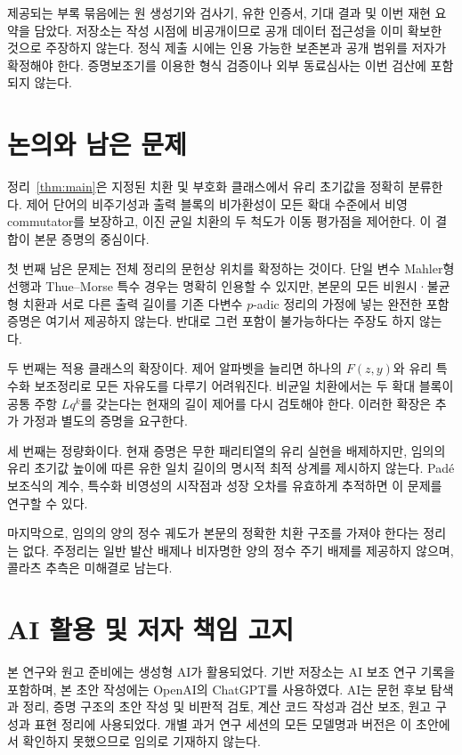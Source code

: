 \documentclass[11pt,a4paper]{article}
\theoremstyle{koreanplain}
\begin{document}
제공되는 부록 묶음에는 원 생성기와 검사기, 유한 인증서, 기대 결과 및 이번 재현 요약을 담았다. 저장소는 작성 시점에 비공개이므로 공개 데이터 접근성을 이미 확보한 것으로 주장하지 않는다. 정식 제출 시에는 인용 가능한 보존본과 공개 범위를 저자가 확정해야 한다. 증명보조기를 이용한 형식 검증이나 외부 동료심사는 이번 검산에 포함되지 않는다.

\section{논의와 남은 문제}

정리~\ref{thm:main}은 지정된 치환 및 부호화 클래스에서 유리 초기값을 정확히 분류한다. 제어 단어의 비주기성과 출력 블록의 비가환성이 모든 확대 수준에서 비영 commutator를 보장하고, 이진 균일 치환의 두 척도가 이동 평가점을 제어한다. 이 결합이 본문 증명의 중심이다.

첫 번째 남은 문제는 전체 정리의 문헌상 위치를 확정하는 것이다. 단일 변수 Mahler형 선행과 Thue--Morse 특수 경우는 명확히 인용할 수 있지만, 본문의 모든 비원시·불균형 치환과 서로 다른 출력 길이를 기존 다변수 $p$-adic 정리의 가정에 넣는 완전한 포함 증명은 여기서 제공하지 않는다. 반대로 그런 포함이 불가능하다는 주장도 하지 않는다.

두 번째는 적용 클래스의 확장이다. 제어 알파벳을 늘리면 하나의 $F(z,y)$와 유리 특수화 보조정리로 모든 자유도를 다루기 어려워진다. 비균일 치환에서는 두 확대 블록이 공통 주항 $Lq^k$를 갖는다는 현재의 길이 제어를 다시 검토해야 한다. 이러한 확장은 추가 가정과 별도의 증명을 요구한다.

세 번째는 정량화이다. 현재 증명은 무한 패리티열의 유리 실현을 배제하지만, 임의의 유리 초기값 높이에 따른 유한 일치 길이의 명시적 최적 상계를 제시하지 않는다. Padé 보조식의 계수, 특수화 비영성의 시작점과 성장 오차를 유효하게 추적하면 이 문제를 연구할 수 있다.

마지막으로, 임의의 양의 정수 궤도가 본문의 정확한 치환 구조를 가져야 한다는 정리는 없다. 주정리는 일반 발산 배제나 비자명한 양의 정수 주기 배제를 제공하지 않으며, 콜라츠 추측은 미해결로 남는다.

\section{AI 활용 및 저자 책임 고지}\label{sec:ai}

본 연구와 원고 준비에는 생성형 AI가 활용되었다. 기반 저장소는 AI 보조 연구 기록을 포함하며, 본 초안 작성에는 OpenAI의 ChatGPT를 사용하였다. AI는 문헌 후보 탐색과 정리, 증명 구조의 초안 작성 및 비판적 검토, 계산 코드 작성과 검산 보조, 원고 구성과 표현 정리에 사용되었다. 개별 과거 연구 세션의 모든 모델명과 버전은 이 초안에서 확인하지 못했으므로 임의로 기재하지 않는다.
\end{document}
